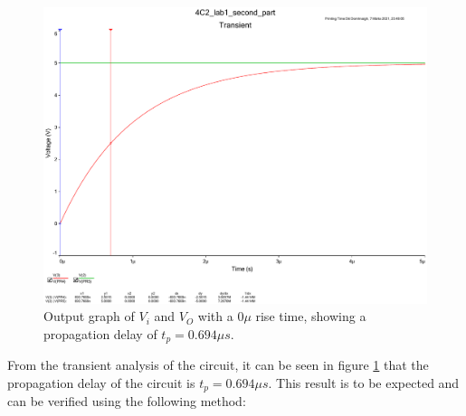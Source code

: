 \documentclass[11pt, a4paper]{article}
\begin{document}
\begin{figure}
  \centering
  \includegraphics[width=\textwidth]{report/img/question_4/rise_time_0u.pdf}
  \caption{\centering Output graph of $V_i$ and $V_O$ with a $0\mu$ rise time, showing a propagation delay of $t_p = 0.694 \mu s$.}
    \label{fig:0rt}
\end{figure}

From the transient analysis of the circuit, it can be seen in figure \ref{fig:0rt} that the propagation delay of the circuit is $t_p = 0.694 \mu s$. This result is to be expected and can be verified using the following method:
\end{document}
